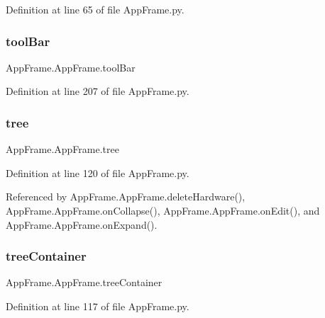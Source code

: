 Definition at line 65 of file App\+Frame.\+py.

\mbox{\label{classAppFrame_1_1AppFrame_afb1cc36f0b7b6ca781f5d1bfadc2e046}} 
\subsubsection{\texorpdfstring{tool\+Bar}{toolBar}}
{\footnotesize\ttfamily App\+Frame.\+App\+Frame.\+tool\+Bar}



Definition at line 207 of file App\+Frame.\+py.

\mbox{\label{classAppFrame_1_1AppFrame_a732c7cf0faafddef1421a289789ccf86}} 
\subsubsection{\texorpdfstring{tree}{tree}}
{\footnotesize\ttfamily App\+Frame.\+App\+Frame.\+tree}



Definition at line 120 of file App\+Frame.\+py.



Referenced by App\+Frame.\+App\+Frame.\+delete\+Hardware(), App\+Frame.\+App\+Frame.\+on\+Collapse(), App\+Frame.\+App\+Frame.\+on\+Edit(), and App\+Frame.\+App\+Frame.\+on\+Expand().

\mbox{\label{classAppFrame_1_1AppFrame_a651f8f562f6becc25a2da6b7e85e8107}} 
\subsubsection{\texorpdfstring{tree\+Container}{treeContainer}}
{\footnotesize\ttfamily App\+Frame.\+App\+Frame.\+tree\+Container}



Definition at line 117 of file App\+Frame.\+py.

